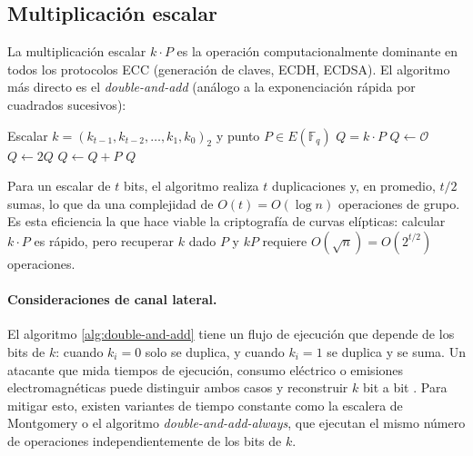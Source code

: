\subsection{Multiplicación escalar}
\label{subsec:ecc-mult-escalar}

La multiplicación escalar $k \cdot P$ es la operación computacionalmente dominante en todos los protocolos ECC (generación de claves, ECDH, ECDSA). El algoritmo más directo es el \emph{double-and-add} (análogo a la exponenciación rápida por cuadrados sucesivos):

\begin{algorithm}[htbp]
\caption{Double-and-add para multiplicación escalar}
\label{alg:double-and-add}
\begin{algorithmic}[1]
\Require Escalar $k = (k_{t-1}, k_{t-2}, \ldots, k_1, k_0)_2$ y punto $P \in E(\mathbb{F}_q)$
\Ensure $Q = k \cdot P$
\State $Q \leftarrow \mathcal{O}$ 
    \State $Q \leftarrow 2Q$ 
        \State $Q \leftarrow Q + P$ 
    \EndIf
\EndFor
\State \Return $Q$
\end{algorithmic}
\end{algorithm}

Para un escalar de $t$ bits, el algoritmo realiza $t$ duplicaciones y, en promedio, $t/2$ sumas, lo que da una complejidad de $O(t) = O(\log n)$ operaciones de grupo. Es esta eficiencia la que hace viable la criptografía de curvas elípticas: calcular $k \cdot P$ es rápido, pero recuperar $k$ dado $P$ y $kP$ requiere $O(\sqrt{n}) = O(2^{t/2})$ operaciones.

\paragraph{Consideraciones de canal lateral.}
El algoritmo \ref{alg:double-and-add} tiene un flujo de ejecución que depende de los bits de $k$: cuando $k_i = 0$ solo se duplica, y cuando $k_i = 1$ se duplica y se suma. Un atacante que mida tiempos de ejecución, consumo eléctrico o emisiones electromagnéticas puede distinguir ambos casos y reconstruir $k$ bit a bit \cite{kocher1999dpa}. Para mitigar esto, existen variantes de tiempo constante como la escalera de Montgomery o el algoritmo \textit{double-and-add-always}, que ejecutan el mismo número de operaciones independientemente de los bits de $k$.


